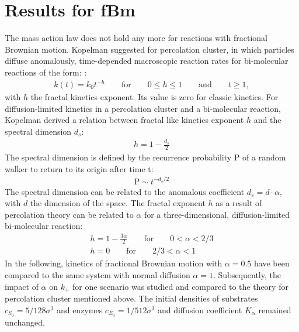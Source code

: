 \documentclass[
  a4paper,BCOR10mm,twoside,
  headsepline,footsepline,%
  fleqn,openbib
]{scrbook}
\begin{document}
\section{Results for fBm}
The mass action law does not hold any more for reactions with fractional Brownian motion. Kopelman suggested for percolation cluster, in which particles diffuse  anomalously, time-depended macroscopic reaction rates for bi-molecular reactions of the form: \cite{Kopelman1988}:
\begin{align} \label{ktime}
k(t)=k_0 t^{-h} \qquad \text{for} \qquad 0 \leq h \leq 1 \qquad \text{and} \qquad t \geq 1,
\end{align}
with $h$ the fractal kinetics exponent. Its value is zero for classic kinetics.  For  diffusion-limited kinetics in a percolation cluster and a bi-molecular reaction, Kopelman derived a relation between fractal like kinetics exponent $h$ and the spectral dimension $d_s$:
\begin{align}
 h=1-\frac{d_s}{2}
\end{align}
The spectral dimension is defined by the recurrence probability $\mathrm{P}$ of a random walker to return to its origin after time t:
\begin{align}
 \mathrm{P}\sim t^{-d_s/2}
\end{align}
The spectral dimension can be related to the anomalous coefficient $d_s=d\cdot\alpha$, with $d$ the dimension of the space. The fractal exponent $h$ as a result of percolation theory can be related to $\alpha$ for a three-dimensional, diffusion-limited bi-molecular reaction:
\begin{align} \label{koppelmaneq}
 h=1-\frac{3 \alpha}{2} \qquad \text{for} \qquad 0<\alpha<2/3 \\
 h=0 \qquad \text{for} \qquad 2/3<\alpha<1
\end{align}
In the following, kinetics of fractional Brownian motion with $\alpha=0.5$ have been compared to the same system with normal diffusion $\alpha=1$. Subsequently, the impact of $\alpha$ on $k_{+}$ for one scenario was studied and compared to the theory for percolation cluster mentioned above. The initial densities of substrates $c_{S_0}=5/128\sigma^3$ and enzymes  $c_{E_0}=1/512 \sigma^3$ and diffusion coefficient $K_{\alpha}$ remained unchanged.
\end{document}
